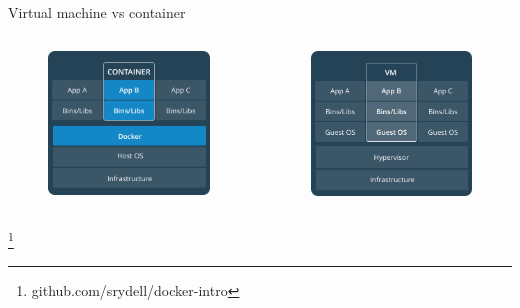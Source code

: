 \documentclass[12pt]{beamer}
\newcommand\blfootnote[1]{%
  \begingroup
  \renewcommand\thefootnote{}\footnote{#1}%
  \addtocounter{footnote}{-1}%
  \endgroup
}
\begin{document}
\begin{frame}{Virtual machine vs container}
    \begin{columns}
        \column{2.5in}
            \begin{figure}[h!]
                \centering
                \includegraphics[width=.8\textwidth]{../figures/containers.png}
            \end{figure}
        \column{2.5in}
            \begin{figure}[h!]
                \centering
                \includegraphics[width=.8\textwidth]{../figures/vm.png}
            \end{figure}
    \end{columns}
    \blfootnote{github.com/srydell/docker-intro}
\end{frame}
\end{document}
